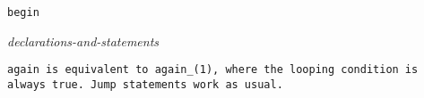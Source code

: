 
\tt{begin}

\s\s\s\s\it{declarations-and-statements}\opt



\tt{again} is equivalent to \tt{again_(1)},
where the looping condition is always true.
Jump statements work as usual.
